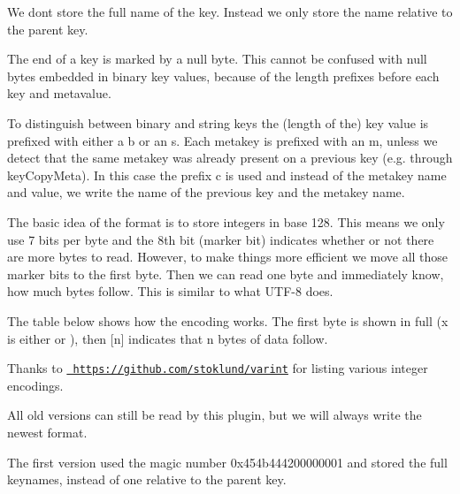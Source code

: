 We don\textquotesingle{}t store the full name of the key. Instead we only store the name relative to the parent key.

The end of a key is marked by a null byte. This cannot be confused with null bytes embedded in binary key values, because of the length prefixes before each key and metavalue.

To distinguish between binary and string keys the (length of the) key value is prefixed with either a {\ttfamily b} or an {\ttfamily s}. Each metakey is prefixed with an {\ttfamily m}, unless we detect that the same metakey was already present on a previous key (e.\+g. through {\ttfamily key\+Copy\+Meta}). In this case the prefix {\ttfamily c} is used and instead of the metakey name and value, we write the name of the previous key and the metakey name.

The basic idea of the format is to store integers in base 128. This means we only use 7 bits per byte and the 8th bit (marker bit) indicates whether or not there are more bytes to read. However, to make things more efficient we move all those marker bits to the first byte. Then we can read one byte and immediately know, how much bytes follow. This is similar to what U\+T\+F-\/8 does.

The table below shows how the encoding works. The first byte is shown in full ({\ttfamily x} is either {} or {}), then {\ttfamily \mbox{[}n\mbox{]}} indicates that {\ttfamily n} bytes of data follow.


\begin{DoxyCode}{0}
\end{DoxyCode}


Thanks to \href{https://github.com/stoklund/varint}{\texttt{ https\+://github.\+com/stoklund/varint}} for listing various integer encodings.

All old versions can still be read by this plugin, but we will always write the newest format.

The first version used the magic number {\ttfamily 0x454b444200000001} and stored the full keynames, instead of one relative to the parent key.

